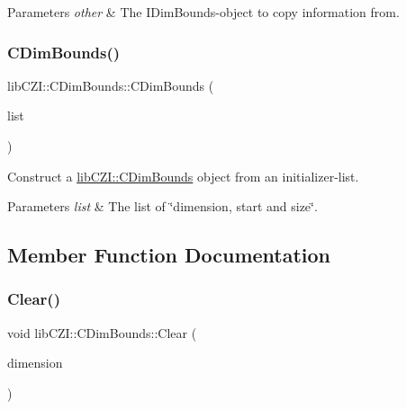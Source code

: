 \begin{DoxyParams}{Parameters}
{\em other} & The I\+Dim\+Bounds-\/object to copy information from. \\
\hline
\end{DoxyParams}
\mbox{\label{classlib_c_z_i_1_1_c_dim_bounds_aae378201c633fa582d3af0740b1b634a}} 
\subsubsection{\texorpdfstring{C\+Dim\+Bounds()}{CDimBounds()}\hspace{0.1cm}{\footnotesize\ttfamily [2/2]}}
{\footnotesize\ttfamily lib\+C\+Z\+I\+::\+C\+Dim\+Bounds\+::\+C\+Dim\+Bounds (\begin{DoxyParamCaption}\item[{std\+::initializer\+\_\+list$<$ \hyperlink{structlib_c_z_i_1_1_dimension_and_start_size}{Dimension\+And\+Start\+Size} $>$}]{list }\end{DoxyParamCaption})\hspace{0.3cm}{\ttfamily [inline]}}

Construct a \hyperlink{classlib_c_z_i_1_1_c_dim_bounds}{lib\+C\+Z\+I\+::\+C\+Dim\+Bounds} object from an initializer-\/list. 
\begin{DoxyParams}{Parameters}
{\em list} & The list of \char`\"{}dimension, start and size\char`\"{}. \\
\hline
\end{DoxyParams}


\subsection{Member Function Documentation}
\mbox{\label{classlib_c_z_i_1_1_c_dim_bounds_a96a5f7ec6f13896998eff3c7d2c7e5bf}} 
\subsubsection{\texorpdfstring{Clear()}{Clear()}}
{\footnotesize\ttfamily void lib\+C\+Z\+I\+::\+C\+Dim\+Bounds\+::\+Clear (\begin{DoxyParamCaption}\item[{\hyperlink{namespacelib_c_z_i_a55049658acf59d0eddfaebcad16df424}{lib\+C\+Z\+I\+::\+Dimension\+Index}}]{dimension }\end{DoxyParamCaption})\hspace{0.3cm}{\ttfamily [inline]}}

